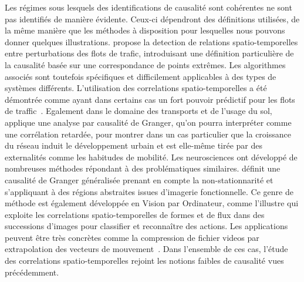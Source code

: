 \documentclass[english]{./sageo}
\begin{document}
Les régimes sous lesquels des identifications de causalité sont cohérentes ne sont pas identifiés de manière évidente. Ceux-ci dépendront des définitions utilisées, de la même manière que les méthodes à disposition pour lesquelles nous pouvons donner quelques illustrations. \cite{liu2011discovering} propose la detection de relations spatio-temporelles entre perturbations des flots de trafic, introduisant une définition particulière de la causalité basée sur une correspondance de points extrêmes. Les algorithmes associés sont toutefois spécifiques et difficilement applicables à des types de systèmes différents. L'utilisation des correlations spatio-temporelles a été démontrée comme ayant dans certains cas un fort pouvoir prédictif pour les flots de traffic~\cite{min2011real}. Egalement dans le domaine des transports et de l'usage du sol, \cite{xie2009streetcars} applique une analyse par causalité de Granger, qu'on pourra interpréter comme une corrélation retardée, pour montrer dans un cas particulier que la croissance du réseau induit le développement urbain et est elle-même tirée par des externalités comme les habitudes de mobilité. Les neurosciences ont développé de nombreuses méthodes répondant à des problématiques similaires. \cite{luo2013spatio} définit une causalité de Granger généralisée prenant en compte la non-stationnarité et s'appliquant à des régions abstraites issues d'imagerie fonctionnelle. Ce genre de méthode est également développée en Vision par Ordinateur, comme l'illustre \cite{ke2007spatio} qui exploite les correlations spatio-temporelles de formes et de flux dans des successions d'images pour classifier et reconnaître des actions. Les applications peuvent être très concrètes comme la compression de fichier videos par extrapolation des vecteurs de mouvement~\cite{chalidabhongse1997fast}. Dans l'ensemble de ces cas, l'étude des correlations spatio-temporelles rejoint les notions faibles de causalité vues précédemment.
\end{document}
